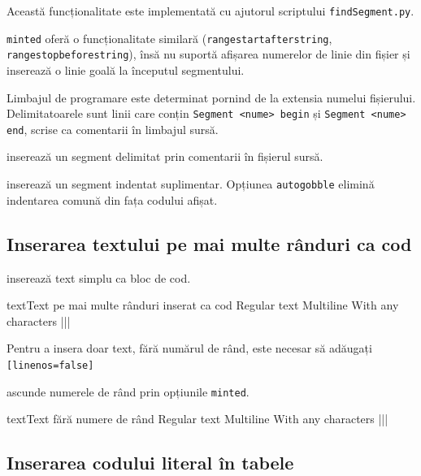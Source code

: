 \documentclass[a4paper,12pt]{report}
\begin{document}
Această funcționalitate este implementată cu ajutorul scriptului \texttt{findSegment.py}.

\verb|minted| oferă o funcționalitate similară (\verb|rangestartafterstring|, \verb|rangestopbeforestring|),
însă nu suportă afișarea numerelor de linie din fișier și inserează o linie goală la începutul segmentului.

Limbajul de programare este determinat pornind de la extensia numelui fișierului.
Delimitatoarele sunt linii care conțin \verb|Segment <nume> begin| și \verb|Segment <nume> end|,
scrise ca comentarii în limbajul sursă.

 inserează un segment delimitat prin comentarii în fișierul sursă.


 inserează un segment indentat suplimentar.
Opțiunea \verb|autogobble| elimină indentarea comună din fața codului afișat.


\subsection{Inserarea textului pe mai multe rânduri ca cod}

 inserează text simplu ca bloc de cod.

\begin{code}{text}{Text pe mai multe rânduri inserat ca cod}
Regular text
Multiline
With any characters |||
\end{code}

Pentru a insera doar text, fără numărul de rând, este necesar să adăugați \verb|[linenos=false]|

 ascunde numerele de rând prin opțiunile \verb|minted|.

\begin{code}{text}{Text fără numere de rând}
Regular text
Multiline
With any characters |||
\end{code}

\subsection{Inserarea codului literal în tabele}
\end{document}
